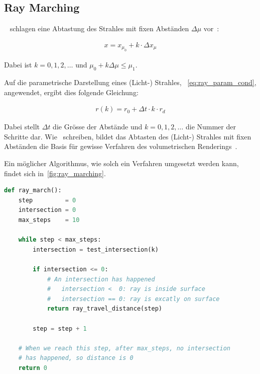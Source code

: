
\subsection{Ray Marching}
\label{subsec:ray_marching}

~\citeauthor{perlin_hypertexture_1989} schlagen eine Abtastung des
Strahles mit fixen Abständen $\Delta \mu$ vor~\parencite[S.
259]{perlin_hypertexture_1989}:

\begin{gather}
    x = x_{\mu_{0}} + k \cdot \Delta x_{\mu}
\end{gather}

Dabei ist $k = 0,1,2,\dots$ und $\mu_{0} + k \Delta \mu \leq \mu_{1}$.

Auf die parametrische Darstellung eines (Licht-) Strahles,
~\autoref{eq:ray_param_cond}, angewendet, ergibt dies folgende Gleichung:

\begin{gather}
    r(k) = r_{0} + \Delta t \cdot k \cdot r_{d}
\end{gather}

Dabei stellt $\Delta t$ die Grösse der Abstände und $k = 0,1,2,\dots$ die Nummer der
Schritte dar. Wie~\citeauthor{hart_ray_1989} schreiben, bildet das Abtasten des
(Licht-) Strahles mit fixen Abständen die Basis für gewisse Verfahren des
volumetrischen Renderings~\parencite[S. 291]{hart_ray_1989}.

Ein möglicher Algorithmus, wie solch ein Verfahren umgesetzt werden kann,
findet sich in~\autoref{fig:ray_marching}.

\begin{lstlisting}[language=Python,caption={Eine abstrakte Umsetzung des Ray
        Marchings\protect\footnotemark.},label={fig:ray_marching},captionpos=b,emph={ray_march}]
def ray_march():
    step         = 0
    intersection = 0
    max_steps    = 10

    while step < max_steps:
        intersection = test_intersection(k)

        if intersection <= 0:
            # An intersection has happened
            #   intersection <  0: ray is inside surface
            #   intersection == 0: ray is excatly on surface
            return ray_travel_distance(step)

        step = step + 1

    # When we reach this step, after max_steps, no intersection
    # has happened, so distance is 0
    return 0
\end{lstlisting}

